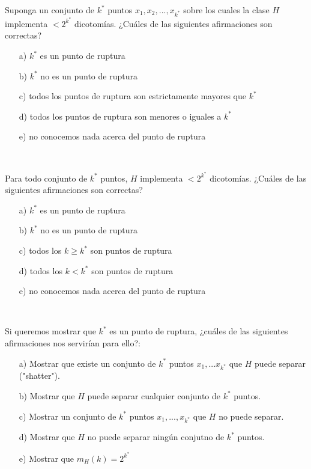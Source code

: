 \documentclass[12pt]{article}
\theoremstyle{definition}
\begin{document}
\begin{pregunta}
Suponga un conjunto de $k^*$ puntos $x_1,x_2,...,x_{k^*}$ sobre los cuales la clase $H$ implementa $<2^{k^*}$ dicotomías. ¿Cuáles de las siguientes afirmaciones son correctas?
\begin{enumerate}
\item[a)] $k^*$ es un punto de ruptura
\item[b)] $k^*$ no es un punto de ruptura
\item[c)] todos los puntos de ruptura son estrictamente mayores que $k^*$
\item[d)] todos los puntos de ruptura son menores o iguales a $k^*$
\item[e)] no conocemos nada acerca del punto de ruptura
\end{enumerate}
\textit{ }\\

\end{pregunta}

\begin{pregunta}
Para todo conjunto de $k^*$ puntos, $H$ implementa $<2^{k^*}$ dicotomías. ¿Cuáles de las siguientes afirmaciones son correctas?
\begin{enumerate}
\item[a)] $k^*$ es un punto de ruptura
\item[b)] $k^*$ no es un punto de ruptura
\item[c)] todos los $k \geqslant k^*$ son puntos de ruptura
\item[d)] todos los $k < k^*$ son puntos de ruptura
\item[e)] no conocemos nada acerca del punto de ruptura
\end{enumerate}
\textit{ }\\

\end{pregunta}

\begin{pregunta}
Si queremos mostrar que $k^*$ es un punto de ruptura, ¿cuáles de las siguientes afirmaciones nos servirían para ello?:
\begin{enumerate}
\item[a)] Mostrar que existe un conjunto de $k^*$ puntos $x_1,...x_{k^*}$ que $H$ puede separar ("shatter").
\item[b)] Mostrar que $H$ puede separar cualquier conjunto de $k^*$ puntos.
\item[c)] Mostrar un conjunto de $k^*$ puntos $x_1,...,x_{k^*}$ que $H$ no puede separar.
\item[d)] Mostrar que $H$ no puede separar ningún conjutno de $k^*$ puntos.
\item[e)] Mostrar que $m_H(k)=2^{k^*}$
\end{enumerate}
\textit{ }\\

\end{pregunta}
\end{document}
